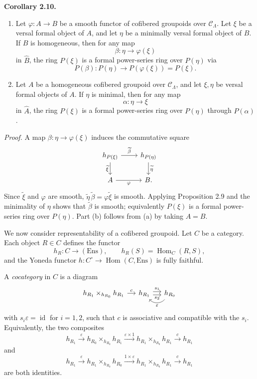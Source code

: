 \documentclass[11pt]{article}
\providecommand{\Hom}{\operatorname{Hom}}
\begin{document}
\textbf{Corollary 2.10.}
\begin{enumerate}[label=(\alph*)]
\item Let \(\varphi:A\to B\) be a smooth functor of cofibered groupoids over
\(\mathcal C_\Lambda\). Let \(\xi\) be a versal formal object of \(A\), and let \(\eta\) be a
minimally versal formal object of \(B\). If \(B\) is homogeneous, then for any map
\[
 \beta:\eta\longrightarrow \varphi(\xi)
\]
in \(\widehat B\), the ring \(P(\xi)\) is a formal power-series ring over \(P(\eta)\) via
\[
 P(\beta):P(\eta)\longrightarrow P(\varphi(\xi))=P(\xi).
\]

\item Let \(A\) be a homogeneous cofibered groupoid over \(\mathcal C_\Lambda\), and let
\(\xi,\eta\) be versal formal objects of \(A\). If \(\eta\) is minimal, then for any map
\[
 \alpha:\eta\longrightarrow \xi
\]
in \(\widehat A\), the ring \(P(\xi)\) is a formal power-series ring over \(P(\eta)\) through
\(P(\alpha)\).
\end{enumerate}

\emph{Proof.} A map \(\beta:\eta\to\varphi(\xi)\) induces the commutative square
\[
\begin{tikzcd}
h_{P(\xi)} \arrow[r,"\widetilde\beta"] \arrow[d,"\widetilde\xi"'] &
h_{P(\eta)} \arrow[d,"\widetilde\eta"]\\
A \arrow[r,"\varphi"'] & B .
\end{tikzcd}
\]
Since \(\widetilde\xi\) and \(\varphi\) are smooth, \(\widetilde\eta\,\widetilde\beta
=\varphi\widetilde\xi\) is smooth. Applying Proposition 2.9 and the minimality of \(\eta\)
shows that \(\widetilde\beta\) is smooth; equivalently \(P(\xi)\) is a formal power-series
ring over \(P(\eta)\). Part (b) follows from (a) by taking \(A=B\).

We now consider representability of a cofibered groupoid. Let \(C\) be a category. Each
object \(R\in C\) defines the functor
\[
 h_R:C\longrightarrow(\mathrm{Ens}),\qquad h_R(S)=\Hom_C(R,S),
\]
and the Yoneda functor \(h:C^\circ\to\Hom(C,\mathrm{Ens})\) is fully faithful.

A \emph{cocategory} in \(C\) is a diagram
\[
\begin{tikzcd}[column sep=small]
h_{R_1}\times_{h_{R_0}}h_{R_1} \arrow[r,"c"] &
h_{R_1}
\arrow[r,shift left=0.55ex,"s_1"]
\arrow[r,shift right=0.55ex,"s_2"'] &
h_{R_0}
\arrow[l,bend left=50,"\varepsilon"]
\end{tikzcd}
\]
with \(s_i\varepsilon=\operatorname{id}\) for \(i=1,2\), such that \(c\) is associative and
compatible with the \(s_i\). Equivalently, the two composites
\[
 h_{R_1}\xrightarrow{\varepsilon}
 h_{R_0}\times_{h_{R_0}}h_{R_1}
 \xrightarrow{\varepsilon\times 1}
 h_{R_1}\times_{h_{R_0}}h_{R_1}
 \xrightarrow{c}h_{R_1}
\]
and
\[
 h_{R_1}\xrightarrow{\varepsilon}
 h_{R_1}\times_{h_{R_0}}h_{R_0}
 \xrightarrow{1\times\varepsilon}
 h_{R_1}\times_{h_{R_0}}h_{R_1}
 \xrightarrow{c}h_{R_1}
\]
are both identities.
\end{document}
